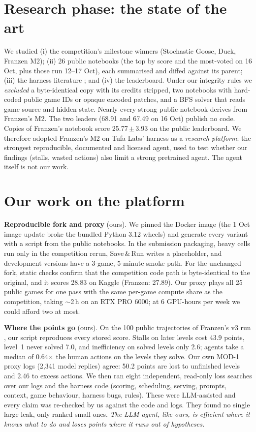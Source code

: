 \documentclass[10pt]{article}
\begin{document}
\section{Research phase: the state of the art}
\label{sec:sota}
We studied (i) the competition's milestone winners (Stochastic Goose, Duck, Franzen M2); (ii) 26 public notebooks (the top by score and the most-voted on 16 Oct, plus those run 12--17 Oct), each summarised and diffed against its parent; (iii) the harness literature \citep{openai2026retained}; and (iv) the leaderboard. Under our integrity rules we \emph{excluded} a byte-identical copy with its credits stripped, two notebooks with hard-coded public game IDs or opaque encoded patches, and a BFS solver that reads game source and hidden state. Nearly every strong public notebook derives from Franzen's M2. The two leaders (68.91 and 67.49 on 16 Oct) publish no code. Copies of Franzen's notebook score 25.77\,$\pm$\,3.93 on the public leaderboard. We therefore adopted Franzen's M2 \citep{franzen2026m2} on Tufa Labs' harness \citep{tufa2026duck} as a \emph{research platform}: the strongest reproducible, documented and licensed agent, used to test whether our findings (stalls, wasted actions) also limit a strong pretrained agent. The agent itself is not our work.

\section{Our work on the platform}
\label{sec:platform}
\textbf{Reproducible fork and proxy} (ours). We pinned the Docker image (the 1 Oct image update broke the bundled Python 3.12 wheels) and generate every variant with a script from the public notebooks. In the submission packaging, heavy cells run only in the competition rerun, Save\,\&\,Run writes a placeholder, and development versions have a 3-game, 5-minute smoke path. For the unchanged fork, static checks confirm that the competition code path is byte-identical to the original, and it scores 28.83 on Kaggle (Franzen: 27.89). Our proxy plays all 25 public games for one pass with the same per-game compute share as the competition, taking $\sim$2\,h on an RTX PRO 6000; at 6 GPU-hours per week we could afford two at most.

\textbf{Where the points go} (ours). On the 100 public trajectories of Franzen's v3 run \citep{skarin2026}, our script reproduces every stored score. Stalls on later levels cost 43.9 points, level~1 never solved 7.0, and inefficiency on solved levels only 2.6; agents take a median of 0.64$\times$ the human actions on the levels they solve. Our own MOD-1 proxy logs (2{,}341 model replies) agree: 50.2 points are lost to unfinished levels and 2.46 to excess actions. We then ran eight independent, read-only loss searches over our logs and the harness code (scoring, scheduling, serving, prompts, context, game behaviour, harness bugs, rules). These were LLM-assisted and every claim was re-checked by us against the code and logs. They found no single large leak, only ranked small ones. \emph{The LLM agent, like ours, is efficient where it knows what to do and loses points where it runs out of hypotheses.}
\end{document}
